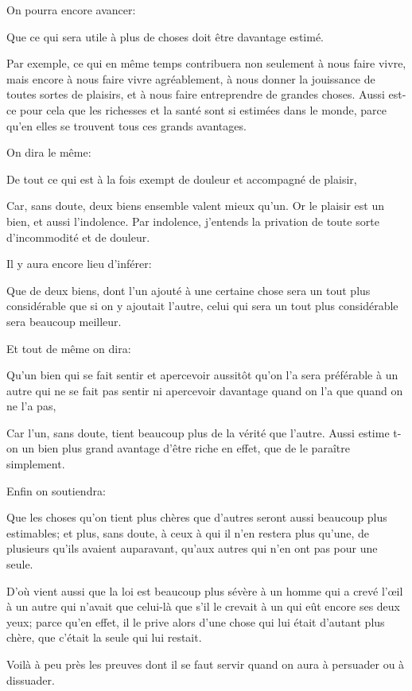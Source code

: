 \bigbreak

On pourra encore avancer:

\begin{lieu}
  Que ce qui sera utile à plus de choses doit être davantage estimé.
\end{lieu}

Par exemple, ce qui en même temps contribuera non seulement à nous faire vivre, mais encore à nous faire vivre agréablement,
à nous donner la jouissance de toutes sortes de plaisirs, et à nous faire entreprendre de grandes choses. Aussi est-ce pour
cela que les richesses et la santé sont si estimées dans le monde, parce qu'en elles se trouvent tous ces grands avantages.

\bigbreak

On dira le même:

\begin{lieu}
  De tout ce qui est à la fois exempt de douleur et accompagné de plaisir,
\end{lieu}

Car, sans doute, deux biens ensemble valent mieux qu'un. Or le plaisir est un bien, et aussi l'indolence. Par indolence,
j'entends la privation de toute sorte d'incommodité et de douleur.

\bigbreak

Il y aura encore lieu d'inférer:

\begin{lieu}
  Que de deux biens, dont l'un ajouté à une certaine chose sera un tout plus considérable que si on y ajoutait l'autre,
  celui qui sera un tout plus considérable sera beaucoup meilleur.
\end{lieu}

Et tout de même on dira:

\begin{lieu}
  Qu'un bien qui se fait sentir et apercevoir aussitôt qu'on l'a sera préférable à un autre qui ne se fait pas sentir ni
  apercevoir davantage quand on l'a que quand on ne l'a pas,
\end{lieu}

Car l'un, sans doute, tient beaucoup plus de la vérité que l'autre. Aussi estime t-on un bien plus grand avantage d'être
riche en effet, que de le paraître simplement.

\bigbreak

Enfin on soutiendra:

\begin{lieu}
  Que les choses qu'on tient plus chères que d'autres seront aussi beaucoup plus estimables; et plus, sans doute, à ceux à
  qui il n'en restera plus qu'une, de plusieurs qu'ils avaient auparavant, qu'aux autres qui n'en ont pas pour une seule.
\end{lieu}

D'où vient aussi que la loi est beaucoup plus sévère à un homme qui a crevé l'œil à un autre qui n'avait que celui-là que s'il
le crevait à un qui eût encore ses deux yeux; parce qu'en effet, il le prive alors d'une chose qui lui était d'autant plus chère,
que c'était la seule qui lui restait.

\bigbreak

Voilà à peu près les preuves dont il se faut servir quand on aura à persuader ou à dissuader.
